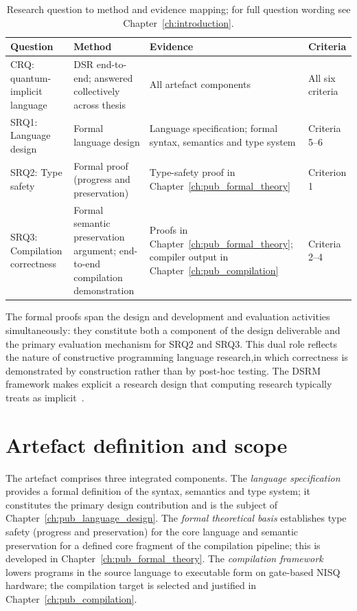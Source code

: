 \begin{table}[h]
    \centering
    \footnotesize
    \renewcommand{\arraystretch}{1.6}
    \begin{tabular}{@{}p{}p{}p{}p{}@{}}
        \toprule
        \textbf{Question}              & \textbf{Method}                                                             & \textbf{Evidence}                                                                                       & \textbf{Criteria} \\
        \midrule
        CRQ: quantum-implicit language & DSR end-to-end; answered collectively across thesis& All artefact components& All six criteria \\
        SRQ1: Language design          & Formal language design                                                      & Language specification; formal syntax, semantics and type system& Criteria 5--6 \\
        SRQ2: Type safety              & Formal proof (progress and preservation)                                    & Type-safety proof in Chapter~\ref{ch:pub_formal_theory}& Criterion 1 \\
        SRQ3: Compilation correctness  & Formal semantic preservation argument; end-to-end compilation demonstration& Proofs in Chapter~\ref{ch:pub_formal_theory}; compiler output in Chapter~\ref{ch:pub_compilation}& Criteria 2--4 \\
        \bottomrule
    \end{tabular}
    \caption{Research question to method and evidence mapping; for full question
    wording see Chapter~\ref{ch:introduction}.}
    \label{tab:methodology:srq-mapping}
\end{table}

The formal proofs span the design and development and evaluation activities simultaneously: they constitute both a component of the design deliverable and the primary evaluation mechanism for SRQ2 and SRQ3.
This dual role reflects the nature of constructive programming language research,in which correctness is demonstrated by construction rather than by post-hoc testing.
The DSRM framework makes explicit a research design that computing research typically treats as implicit~\cite{Peffers2007DSRM}.


\section{Artefact definition and scope}\label{sec:methodology:artefact}
The artefact comprises three integrated components.
The \textit{language specification} provides a formal definition of the syntax, semantics and type system; it constitutes the primary design contribution and is the subject of Chapter~\ref{ch:pub_language_design}.
The \textit{formal theoretical basis} establishes type safety (progress and preservation) for the core language and semantic preservation for a defined core fragment of the compilation pipeline; this is developed in Chapter~\ref{ch:pub_formal_theory}.
The \textit{compilation framework} lowers programs in the source language to executable form on gate-based NISQ hardware; the compilation target is selected and justified in Chapter~\ref{ch:pub_compilation}.

